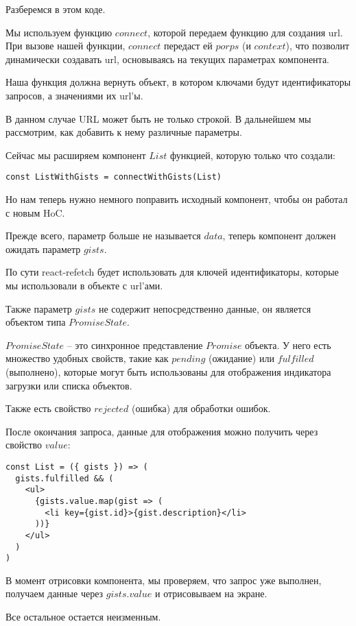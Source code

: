 Разберемся в этом коде.

Мы используем функцию $connect$, которой передаем функцию для создания url. При вызове нашей функции, $connect$ передаст ей $porps$ (и $context$), что позволит динамически создавать url, основываясь на текущих параметрах компонента.

Наша функция должна вернуть объект, в котором ключами будут идентификаторы запросов, а значениями их url'ы.

В данном случае URL может быть не только строкой. В дальнейшем мы рассмотрим, как добавить к нему различные параметры.

Сейчас мы расширяем компонент $List$ функцией, которую только что создали:

\begin{lstlisting}
const ListWithGists = connectWithGists(List)
\end{lstlisting}

Но нам теперь нужно немного поправить исходный компонент, чтобы он работал с новым HoC.

Прежде всего, параметр больше не называется $data$, теперь компонент должен ожидать параметр $gists$.

По сути react-refetch будет использовать для ключей идентификаторы, которые мы использовали в объекте с url'ами.

Также параметр $gists$ не содержит непосредственно данные, он является объектом типа $PromiseState$.

$PromiseState$ -- это синхронное представление $Promise$ объекта. У него есть множество удобных свойств, такие как $pending$ (ожидание) или $fulfilled$ (выполнено), которые могут быть использованы для отображения индикатора загрузки или списка объектов.

Также есть свойство $rejected$ (ошибка) для обработки ошибок.

После окончания запроса, данные для отображения можно получить через свойство $value$:

\begin{lstlisting}
const List = ({ gists }) => (
  gists.fulfilled && (
    <ul>
      {gists.value.map(gist => (
        <li key={gist.id}>{gist.description}</li>
      ))}
    </ul> 
  )
)
\end{lstlisting}

В момент отрисовки компонента, мы проверяем, что запрос уже выполнен, получаем данные через $gists.value$ и отрисовываем на экране.

Все остальное остается неизменным.

